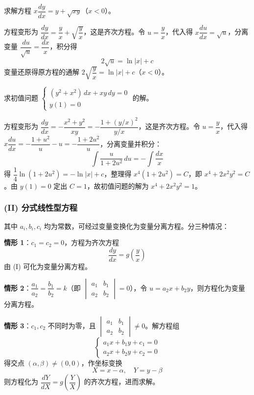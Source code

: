 \begin{example}
求解方程 $x\dfrac{dy}{dx} = y + \sqrt{xy}$（$x < 0$）。
\end{example}

\begin{solution}
方程变形为 $\dfrac{dy}{dx} = \dfrac{y}{x} + \sqrt{\dfrac{y}{x}}$，这是齐次方程。令 $u = \dfrac{y}{x}$，代入得 $x\dfrac{du}{dx} = \sqrt{u}$，分离变量 $\dfrac{du}{\sqrt{u}} = \dfrac{dx}{x}$，积分得
$$2\sqrt{u} = \ln|x| + c$$
变量还原得原方程的通解 $2\sqrt{\dfrac{y}{x}} = \ln|x| + c$（$x<0$）。
\end{solution}

\begin{example}
求初值问题 $\begin{cases} (y^2 + x^2)\,dx + xy\,dy = 0 \\ y(1) = 0 \end{cases}$ 的解。
\end{example}

\begin{solution}
方程变形为 $\dfrac{dy}{dx} = -\dfrac{x^2+y^2}{xy} = -\dfrac{1+(y/x)^2}{y/x}$，这是齐次方程。令 $u = \dfrac{y}{x}$，代入得 $x\dfrac{du}{dx} = -\dfrac{1+u^2}{u} - u = -\dfrac{1+2u^2}{u}$，分离变量并积分：
$$\int \frac{u}{1+2u^2}\,du = -\int \frac{dx}{x}$$
得 $\dfrac{1}{4}\ln(1+2u^2) = -\ln|x| + c$，整理得 $x^4(1+2u^2) = C$，即 $x^4 + 2x^2y^2 = C$。由 $y(1)=0$ 定出 $C=1$，故初值问题的解为 $x^4 + 2x^2y^2 = 1$。
\end{solution}

\subsubsection{(II) 分式线性型方程}

其中 $a_i, b_i, c_i$ 均为常数，可经过变量变换化为变量分离方程。分三种情况：

\textbf{情形 1}：$c_1 = c_2 = 0$，方程为齐次方程
$$\frac{dy}{dx} = g\left(\frac{y}{x}\right)$$
由 (I) 可化为变量分离方程。

\textbf{情形 2}：$\dfrac{a_1}{a_2} = \dfrac{b_1}{b_2} = k$（即 $\begin{vmatrix} a_1 & b_1 \\ a_2 & b_2 \end{vmatrix} = 0$），令 $u = a_2 x + b_2 y$，则方程化为变量分离方程。

\textbf{情形 3}：$c_1, c_2$ 不同时为零，且 $\begin{vmatrix} a_1 & b_1 \\ a_2 & b_2 \end{vmatrix} \neq 0$。解方程组
$$\begin{cases} a_1x + b_1y + c_1 = 0 \\ a_2x + b_2y + c_2 = 0 \end{cases}$$
得交点 $(\alpha, \beta) \neq (0,0)$，作坐标变换
$$X = x - \alpha, \quad Y = y - \beta$$
则方程化为 $\dfrac{dY}{dX} = g\left(\dfrac{Y}{X}\right)$ 的齐次方程，进而求解。

